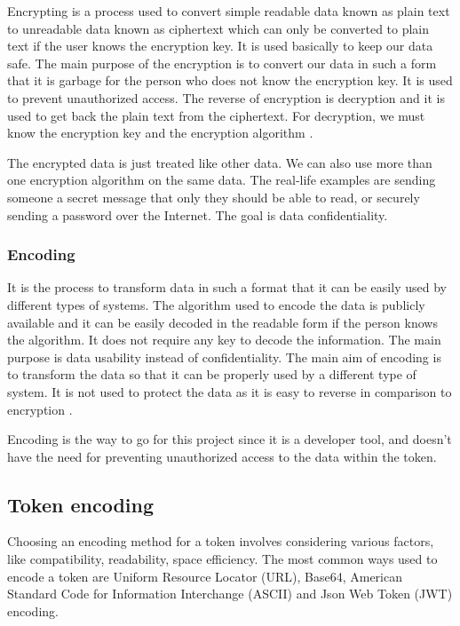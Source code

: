 Encrypting is a process used to convert simple readable data known as plain text to unreadable data known as ciphertext which can only be converted to plain text if the user knows the encryption key. It is used basically to keep our data safe. The main purpose of the encryption is to convert our data in such a form that it is garbage for the person who does not know the encryption key. It is used to prevent unauthorized access. The reverse of encryption is decryption and it is used to get back the plain text from the ciphertext. For decryption, we must know the encryption key and the encryption algorithm \autocite{CoderSaty}. 

The encrypted data is just treated like other data. We can also use more than one encryption algorithm on the same data. The real-life examples are sending someone a secret message that only they should be able to read, or securely sending a password over the Internet. The goal is data confidentiality.

\subsubsection{Encoding}

It is the process to transform data in such a format that it can be easily used by different types of systems. The algorithm used to encode the data is publicly available and it can be easily decoded in the readable form if the person knows the algorithm. It does not require any key to decode the information. The main purpose is data usability instead of confidentiality. The main aim of encoding is to transform the data so that it can be properly used by a different type of system. It is not used to protect the data as it is easy to reverse in comparison to encryption \autocite{CoderSaty}.

Encoding is the way to go for this project since it is a developer tool, and doesn't have the need for preventing unauthorized access to the data within the token.

\subsection {Token encoding}
\label{ch:token-encoding}

Choosing an encoding method for a token involves considering various factors, like compatibility, readability, space efficiency. The most common ways used to encode a token are Uniform Resource Locator (URL), Base64, American Standard Code for Information Interchange (ASCII) and Json Web Token (JWT) encoding.

